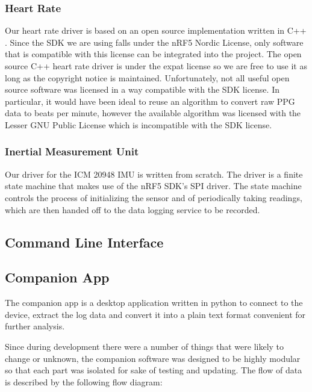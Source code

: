 \subsubsection{Heart Rate}

Our heart rate driver is based on an open source implementation written in
C++ \cite{max86150-ardino}. Since the SDK we are using falls under the nRF5
Nordic License, only software that is compatible with this license can be
integrated into the project. The open source C++ heart rate driver is under the
expat license so we are free to use it as long as the copyright notice is
maintained. Unfortunately, not all useful open source software was licensed in
a way compatible with the SDK license. In particular, it would have been ideal
to reuse an algorithm to convert raw PPG data to beats per minute, however the
available algorithm was licensed with the Lesser GNU Public
License \cite{wasp-os} which is incompatible with the SDK license.

\subsubsection{Inertial Measurement Unit}

Our driver for the ICM 20948 IMU is written from scratch. The driver is a finite
state machine that makes use of the nRF5 SDK's SPI driver. The state machine
controls the process of initializing the sensor and of periodically taking
readings, which are then handed off to the data logging service to be recorded.


\subsection{Command Line Interface}


\subsection{Companion App}

The companion app is a desktop application written in python to connect to the device, extract the log data and convert it into a plain text format convenient for further analysis.

Since during development there were a number of things that were likely to change or unknown, the companion software was designed to be highly modular so that each part was isolated for sake of testing and updating.  The flow of data is described by the following flow diagram:

